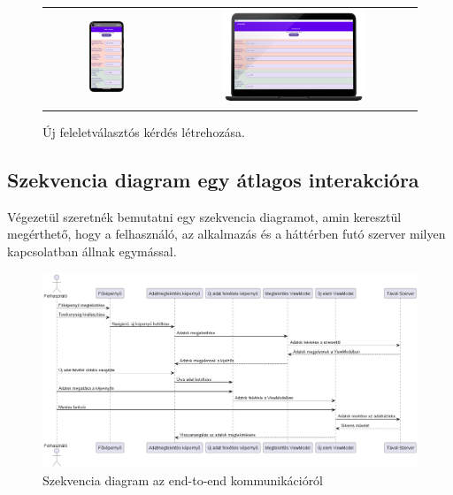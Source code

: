 \begin{figure}[!ht]
    \centering
    \begin{tabular}{cc}
        \includegraphics[width=0.3\textwidth, keepaspectratio]{figures/Submission_Android.png} & 
        \includegraphics[width=0.6\textwidth, keepaspectratio]{figures/Submission_Desktop_framed.png}
    \end{tabular}
    \caption{Új feleletválasztós kérdés létrehozása.}
    \label{fig:SubmissionScreen}
\end{figure}


\subsection{Szekvencia diagram egy átlagos interakcióra}

Végezetül szeretnék bemutatni egy szekvencia diagramot, amin keresztül megérthető, hogy a felhasználó, az alkalmazás és a háttérben futó szerver milyen kapcsolatban állnak egymással.

\begin{figure}[!ht]
    \centering
    \includegraphics[width=150mm, keepaspectratio]{figures/Defaut Communication.png}
    \caption{Szekvencia diagram az end-to-end kommunikációról}
    \label{fig:DefaultCommunication}
\end{figure}

